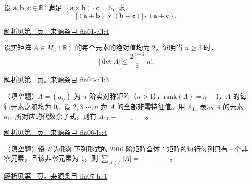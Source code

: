 \documentclass[12pt,fontset=fandol]{ctexart}
\begin{document}
\begin{example}\label{ex:fin01-all:4}

设 $\boldsymbol a,\boldsymbol b,\boldsymbol c\in\mathbb R^3$ 满足
$(\boldsymbol a\times\boldsymbol b)\cdot\boldsymbol c=6$，求
\[
\bigl[(\boldsymbol a+\boldsymbol b)\times(\boldsymbol b+\boldsymbol c)\bigr]
\cdot(\boldsymbol a+\boldsymbol c).
\]

\par\hyperref[ans:fin01-all:4]{解析见第~\pageref{ans:fin01-all:4} 页。}\quad\href{https://github.com/lzxcr/cmc-mathematics/blob/64916fa1fdbc3e444a652eca204d5669058ee321/src/problems/finals/01/04.md}{来源条目 fin01-all:4}

\end{example}

\begin{example}\label{ex:fin04-all:3}

设实矩阵 $A\in M_n(\mathbb R)$ 的每个元素的绝对值均为 $2$。证明当 $n\ge3$ 时，
\[
|\det A|\le\frac{2^{n+1}}3\,n!.
\]

\par\hyperref[ans:fin04-all:3]{解析见第~\pageref{ans:fin04-all:3} 页。}\quad\href{https://github.com/lzxcr/cmc-mathematics/blob/64916fa1fdbc3e444a652eca204d5669058ee321/src/problems/finals/04/03.md}{来源条目 fin04-all:3}

\end{example}

\begin{example}\label{ex:fin06-lo:4}

（填空题）$A=(a_{ij})$ 为 $n$ 阶实对称矩阵（$n>1$），$\mathrm{rank}(A)=n-1$，$A$ 的每行元素之和均为 $0$。设 $2,3,\cdots,n$ 为 $A$ 的全部非零特征值。用 $A_{11}$ 表示 $A$ 的元素 $a_{11}$ 所对应的代数余子式，则有 $A_{11}=\underline{\qquad\qquad}$。

\par\hyperref[ans:fin06-lo:4]{解析见第~\pageref{ans:fin06-lo:4} 页。}\quad\href{https://github.com/lzxcr/cmc-mathematics/blob/64916fa1fdbc3e444a652eca204d5669058ee321/src/problems/finals/06/04.md}{来源条目 fin06-lo:4}

\end{example}

\begin{example}\label{ex:fin07-hi:1}

（填空题）设 $\Gamma$ 为形如下列形式的 2016 阶矩阵全体：矩阵的每行每列只有一个非零元素，且该非零元素为 1，则 $\sum_{A\in\Gamma}\left|A\right|=$ $\underline{\qquad\qquad}$。

\par\hyperref[ans:fin07-hi:1]{解析见第~\pageref{ans:fin07-hi:1} 页。}\quad\href{https://github.com/lzxcr/cmc-mathematics/blob/64916fa1fdbc3e444a652eca204d5669058ee321/src/problems/finals/07/01.md}{来源条目 fin07-hi:1}

\end{example}
\end{document}
